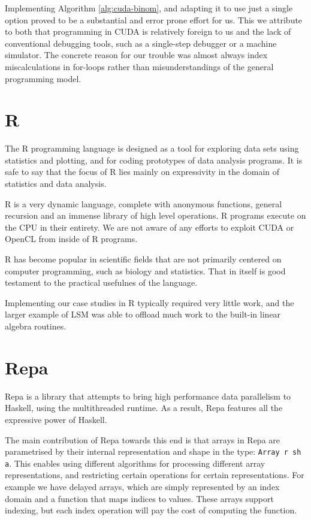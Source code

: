 Implementing Algorithm \ref{alg:cuda-binom}, and adapting it to use just a
single option proved to be a substantial and error prone effort for us. This we
attribute to both that programming in CUDA is relatively foreign to us and the
lack of conventional debugging tools, such as a single-step debugger or a
machine simulator. The concrete reason for our trouble was almost always index
miscalculations in for-loops rather than misunderstandings of the general
programming model.

\section{R}

The R programming language is designed as a tool for exploring data sets using
statistics and plotting, and for coding prototypes of data analysis programs.
It is safe to say that the focus of R lies mainly on expressivity in the domain
of statistics and data analysis.

R is a very dynamic language, complete with anonymous functions, general
recursion and an immense library of high level operations. R programs execute
on the CPU in their entirety. We are not aware of any efforts to exploit CUDA
or OpenCL from inside of R programs.

R has become popular in scientific fields that are not primarily
centered on computer programming, such as biology and
statistics. That in itself is good testament to the practical
usefulnes of the language.

Implementing our case studies in R typically required very little work, and the
larger example of LSM was able to offload much work to the built-in linear
algebra routines.

\section{Repa}

Repa is a library that attempts to bring high performance data parallelism to
Haskell, using the multithreaded runtime. As a result, Repa features all the
expressive power of Haskell.

The main contribution of Repa towards this end is that arrays in Repa are
parametrised by their internal representation and shape in the type:
\texttt{Array r sh a}.  This enables using different algorithms for processing
different array representations, and restricting certain operations for certain
representations. For example we have delayed arrays, which are simply
represented by an index domain and a function that maps indices to values.
These arrays support indexing, but each index operation will pay the cost of
computing the function.

